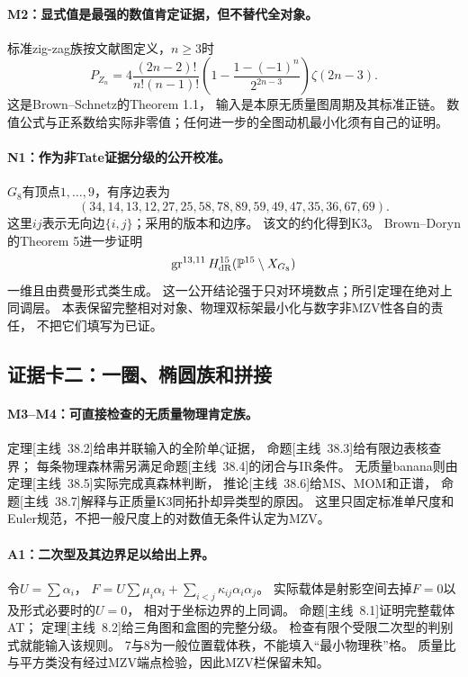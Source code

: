 \documentclass[11pt,a4paper]{ctexart}
\theoremstyle{cnplain}\newtheorem{theorem}{定理}[section]
\theoremstyle{definition}\newtheorem{definition}[theorem]{定义}
\theoremstyle{remark}\newtheorem{remark}[theorem]{注}
\begin{document}
\paragraph{M2：显式值是最强的数值肯定证据，但不替代全对象。}
标准zig-zag族按文献图定义，$n\ge3$时
\[
 P_{Z_n}=4\frac{(2n-2)!}{n!(n-1)!}
 \left(1-\frac{1-(-1)^n}{2^{2n-3}}\right)\zeta(2n-3).
\]
这是Brown--Schnetz的Theorem 1.1\cite{ClassZigzag}，
输入是本原无质量图周期及其标准正链。
数值公式与正系数给实际非零值；任何进一步的全图动机最小化须有自己的证明。

\paragraph{N1：作为非Tate证据分级的公开校准。}
$G_8$有顶点$1,\ldots,9$，有序边表为
\[
 (34,14,13,12,27,25,58,78,89,59,49,47,35,36,67,69).
\]
这里$ij$表示无向边$\{i,j\}$；采用\cite[\S6.2,式(30)]{ClassKthree}的版本和边序。
该文的约化得到K3。
Brown--Doryn的Theorem 5进一步证明
\[
 \operatorname{gr}^{13,11}H^{15}_{\mathrm{dR}}(\mathbb P^{15}\setminus X_{G_8})
\]
一维且由费曼形式类生成\cite{ClassFraming}。
这一公开结论强于只对环境数点；所引定理在绝对上同调层。
本表保留完整相对对象、物理双标架最小化与数字非MZV性各自的责任，
不把它们填写为已证。

\subsection{证据卡二：一圈、椭圆族和拼接}
\paragraph{M3--M4：可直接检查的无质量物理肯定族。}
定理\textup{[主线~38.2]}给串并联输入的全阶单$\zeta$证据，
命题\textup{[主线~38.3]}给有限边表核查界；
每条物理森林需另满足命题\textup{[主线~38.4]}的闭合与IR条件。
无质量banana则由定理\textup{[主线~38.5]}实际完成真森林判断，
推论\textup{[主线~38.6]}给MS、MOM和正谱，
命题\textup{[主线~38.7]}解释与正质量K3同拓扑却异类型的原因。
这里只固定标准单尺度和Euler规范，不把一般尺度上的对数值无条件认定为MZV。

\label{subsec:classelliptic}
\paragraph{A1：二次型及其边界足以给出上界。}
令$U=\sum\alpha_i$，
$F=U\sum\mu_i\alpha_i+\sum_{i<j}\kappa_{ij}\alpha_i\alpha_j$。
实际载体是射影空间去掉$F=0$以及形式必要时的$U=0$，
相对于坐标边界的上同调。
命题\textup{[主线~8.1]}证明完整载体AT；
定理\textup{[主线~8.2]}给三角图和盒图的完整分级。
检查有限个受限二次型的判别式就能输入该规则。
7与8为一般位置载体秩，不能填入“最小物理秩”格。
质量比与平方类没有经过MZV端点检验，因此MZV栏保留未知。
\end{document}
